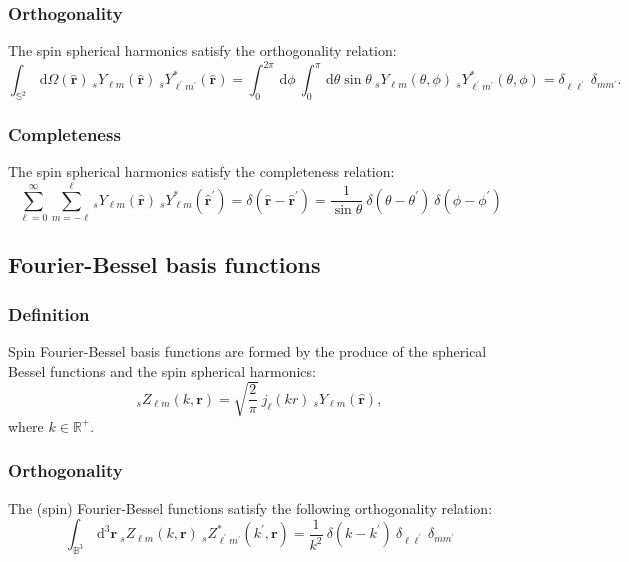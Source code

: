 \documentclass[a4paper,11pt]{article}
\newcommand{\realsnn}{\ensuremath{{\mathbb{R}^{+}}}}
\newcommand{\ball}{\ensuremath{{\mathbb{B}^3}}}
\newcommand{\sphere}{\ensuremath{{\mathbb{S}^2}}}
\newcommand{\dx}{\ensuremath{\mathrm{\,d}}}
\newcommand{\rvec}{{\boldsymbol{r}}}
\newcommand{\rang}{{\boldsymbol{\hat{r}}}}
\newcommand{\rlen}{{r}}
\begin{document}
\subsubsection{Orthogonality}

The spin spherical harmonics satisfy the orthogonality relation:
\begin{equation}
  \int_\sphere \dx \Omega(\rang) \:
  {}_s Y_{\ell m}(\rang) \:
  {}_s Y_{\ell^\prime m^\prime}^\ast(\rang) 
  = 
  \int_0^{2\pi} \dx \phi \:
  \int_0^{\pi} \dx \theta \sin\theta \:
  {}_s Y_{\ell m}(\theta, \phi) \:
  {}_s Y_{\ell^\prime m^\prime}^\ast(\theta, \phi) 
  = 
  \delta_{\ell \ell^\prime} \:
  \delta_{m m^\prime}
  .
\end{equation}

\subsubsection{Completeness}

The spin spherical harmonics satisfy the completeness relation:
\begin{equation}
  \sum_{\ell=0}^\infty \sum_{m=-\ell}^{\ell}
  {}_s Y_{\ell m}(\rang) \:
  {}_s Y_{\ell m}^\ast(\rang^\prime) 
  = 
  \delta(\rang-\rang^\prime)
  = 
  \frac{1}{\sin\theta} \:
  \delta(\theta-\theta^\prime) \:
  \delta(\phi-\phi^\prime)
\end{equation}


\subsection{Fourier-Bessel basis functions}

\subsubsection{Definition}

Spin Fourier-Bessel basis functions are formed by the produce of the spherical Bessel functions and the spin spherical harmonics:
\begin{equation}
  {}_s Z_{\ell m}(k, \rvec) 
  = \sqrt{\frac{2}{\pi}}\:
  j_\ell(k \rlen) \: {}_s Y_{\ell m}(\rang) 
  ,
\end{equation}
where $k \in \realsnn$.

\subsubsection{Orthogonality}

The (spin) Fourier-Bessel functions satisfy the following orthogonality relation:
\begin{equation}
  \int_\ball \dx^3 \rvec \:
  {}_s Z_{\ell m}(k, \rvec) \:
  {}_s Z_{\ell^\prime m^\prime}^\ast(k^\prime, \rvec)   
   = 
  \frac{1}{k^2} \:
  \delta(k-k^\prime) \:
  \delta_{\ell \ell^\prime} \:
  \delta_{m m^\prime}   
\end{equation}
\end{document}
